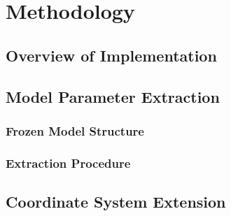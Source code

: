 \documentclass[a4paper,11pt,oneside]{article}
\begin{document}



\section{Methodology}

\subsection{Overview of Implementation}

\subsection{Model Parameter Extraction}
\subsubsection{Frozen Model Structure}

\subsubsection{Extraction Procedure}

\subsection{Coordinate System Extension}
\end{document}
